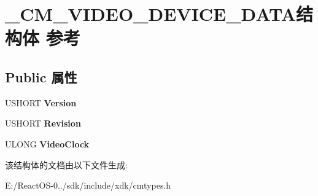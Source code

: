 \hypertarget{struct___c_m___v_i_d_e_o___d_e_v_i_c_e___d_a_t_a}{}\section{\+\_\+\+C\+M\+\_\+\+V\+I\+D\+E\+O\+\_\+\+D\+E\+V\+I\+C\+E\+\_\+\+D\+A\+T\+A结构体 参考}
\label{struct___c_m___v_i_d_e_o___d_e_v_i_c_e___d_a_t_a}
\subsection*{Public 属性}
\begin{DoxyCompactItemize}
\item 
\mbox{\label{struct___c_m___v_i_d_e_o___d_e_v_i_c_e___d_a_t_a_a6328ed7dd4c737e6278092b62ea571af}} 
U\+S\+H\+O\+RT {\bfseries Version}
\item 
\mbox{\label{struct___c_m___v_i_d_e_o___d_e_v_i_c_e___d_a_t_a_a32117fbc372299ea8021baacf3589c3c}} 
U\+S\+H\+O\+RT {\bfseries Revision}
\item 
\mbox{\label{struct___c_m___v_i_d_e_o___d_e_v_i_c_e___d_a_t_a_a19c6415c383982a20e0b05ee92821725}} 
U\+L\+O\+NG {\bfseries Video\+Clock}
\end{DoxyCompactItemize}


该结构体的文档由以下文件生成\+:\begin{DoxyCompactItemize}
\item 
E\+:/\+React\+O\+S-\/0../sdk/include/xdk/cmtypes.\+h\end{DoxyCompactItemize}
